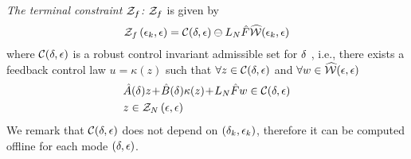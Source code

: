\noindent\textit{The terminal constraint $\mathcal{Z}_{f}$:}
%
$\mathcal{Z}_{f}$ is given by %
\begin{equation}
\label{eq:RMPC1-Zf}
\mathcal{Z}_{f}\left(\epsilon_k,\epsilon\right)=\mathcal{C}(\delta,\epsilon)\ominus L_{N}\hat{F}\widehat{\mathcal{W}}(\epsilon_k,\epsilon)
\end{equation}
where $\mathcal{C}(\delta,\epsilon)$ is a robust control invariant admissible
set for $\delta$ \cite{kerrigan00rcs}, i.e., there exists a feedback control law $u=\kappa(z)$
such that $\forall z\in\mathcal{C}(\delta,\epsilon)$ and $\forall w\in\widehat{\mathcal{W}}(\epsilon,\epsilon)$
\begin{eqnarray}
\label{eq:RMPC1-Zf-invariant}
& \hat{A}(\delta)z \!+\! \hat{B}(\delta)\kappa(z) \!+\! L_{N}\hat{F}w\in\mathcal{C}(\delta,\epsilon) \label{eq:RMPC1-Zf-invariant-dyn}\\
& z\in\mathcal{Z}_{N}\left(\epsilon,\epsilon\right)\label{eq:RMPC1-Zf-invariant-z}
\end{eqnarray}
We remark that $\mathcal{C}(\delta,\epsilon)$ does not depend on $\left(\delta_k,\epsilon_k\right)$, therefore it can be computed offline for each mode $\left(\delta,\epsilon\right)$.
